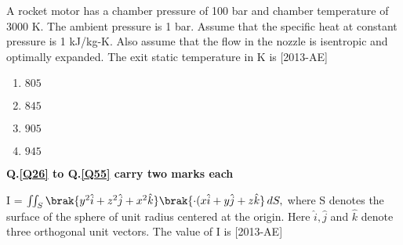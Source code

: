     \item A rocket motor has a chamber pressure of 100 bar and chamber temperature of 3000 K. The ambient pressure is 1 bar. Assume that the specific heat at constant pressure is 1 kJ/kg-K. Also assume that the flow in the nozzle is isentropic and optimally expanded. The exit static temperature in K is  \hfill{[2013-AE]}

    \begin{enumerate}
        \item $805$
        \item $845$
        \item $905$
        \item $945$
    \end{enumerate}

    \textbf{Q.\ref{Q26} to Q.\ref{Q55} carry two marks each} \label{subsec:twomarks}

    \item \label{Q26} I = $\iint_S \brak{ y^2 \hat{i} + z^2 \hat{j} + x^2 \hat{k} }\brak{ \cdot ( x \hat{i} + y \hat{j} + z \hat{k}} \, dS,$  where S denotes the surface of the sphere of unit radius centered at the origin. Here $\hat{i}, \hat{j}$ and $\hat{k}$  denote three orthogonal unit vectors. The value of I is \underline{\hspace{2cm}} \hfill{[2013-AE]}



    




